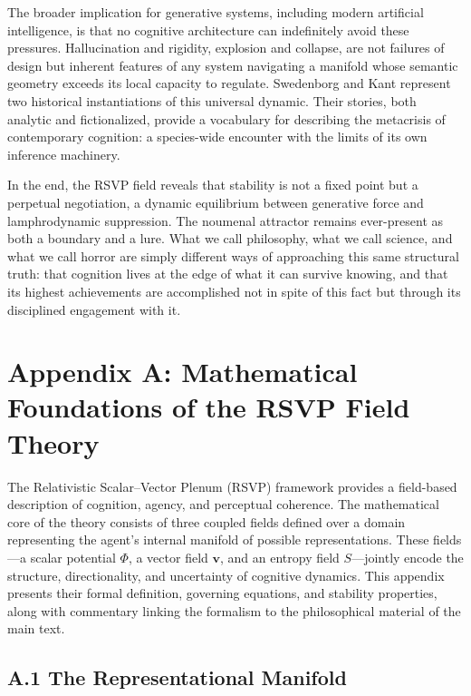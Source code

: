 \documentclass[12pt]{article}
\begin{document}
The broader implication for generative systems, including modern artificial
intelligence, is that no cognitive architecture can indefinitely avoid these
pressures. Hallucination and rigidity, explosion and collapse, are not failures
of design but inherent features of any system navigating a manifold whose
semantic geometry exceeds its local capacity to regulate. Swedenborg and Kant
represent two historical instantiations of this universal dynamic. Their
stories, both analytic and fictionalized, provide a vocabulary for describing
the metacrisis of contemporary cognition: a species-wide encounter with the
limits of its own inference machinery.

In the end, the RSVP field reveals that stability is not a fixed point but a
perpetual negotiation, a dynamic equilibrium between generative force and
lamphrodynamic suppression. The noumenal attractor remains ever-present as both
a boundary and a lure. What we call philosophy, what we call science, and what
we call horror are simply different ways of approaching this same structural
truth: that cognition lives at the edge of what it can survive knowing, and
that its highest achievements are accomplished not in spite of this fact but
through its disciplined engagement with it.

\newpage
\appendix
\section*{Appendix A: Mathematical Foundations of the RSVP Field Theory}

The Relativistic Scalar--Vector Plenum (RSVP) framework provides a field-based 
description of cognition, agency, and perceptual coherence. The mathematical 
core of the theory consists of three coupled fields defined over a domain 
representing the agent’s internal manifold of possible representations. These 
fields---a scalar potential $\Phi$, a vector field $\mathbf{v}$, and an entropy 
field $S$---jointly encode the structure, directionality, and uncertainty of 
cognitive dynamics. This appendix presents their formal definition, governing 
equations, and stability properties, along with commentary linking the 
formalism to the philosophical material of the main text.

\subsection*{A.1 The Representational Manifold}
\end{document}
